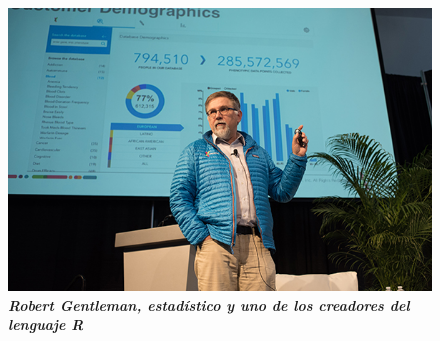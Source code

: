 \documentclass[preview,border={0pt 0pt 0pt 0pt}]{standalone}
\begin{document}
	\begin{figure}[H]
		\centering
		\includegraphics[height=0.4\textheight]{gentleman.jpg}
		\caption*{\bfseries\itshape Robert Gentleman, estadístico y uno de los creadores del lenguaje R}
	\end{figure}
\end{document}
